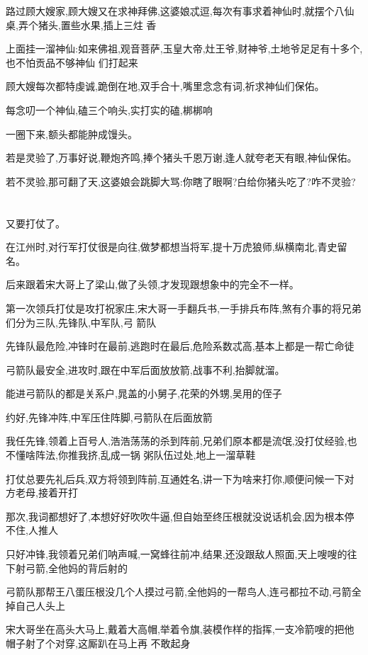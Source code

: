 ﻿\documentclass[12pt]{article}
\begin{document}
路过顾大嫂家,顾大嫂又在求神拜佛,这婆娘忒逗,每次有事求着神仙时,就摆个八仙桌,弄个猪头,置些水果,插上三炷
香

上面挂一溜神仙:如来佛祖,观音菩萨,玉皇大帝,灶王爷,财神爷,土地爷\dldots 足足有十多个,也不怕贡品不够神仙
们打起来

顾大嫂每次都特虔诚,跪倒在地,双手合十,嘴里念念有词,祈求神仙们保佑。

每念叨一个神仙,磕三个响头,实打实的磕,梆梆响\dldots

一圈下来,额头都能肿成馒头。

若是灵验了,万事好说,鞭炮齐鸣,捧个猪头千恩万谢,逢人就夸老天有眼,神仙保佑。

若不灵验,那可翻了天,这婆娘会跳脚大骂:你瞎了眼啊?白给你猪头吃了?咋不灵验?

\section{}

又要打仗了。

在江州时,对行军打仗很是向往,做梦都想当将军,提十万虎狼师,纵横南北,青史留名。

后来跟着宋大哥上了梁山,做了头领,才发现跟想象中的完全不一样。

第一次领兵打仗是攻打祝家庄,宋大哥一手翻兵书,一手排兵布阵,煞有介事的将兄弟们分为三队,先锋队,中军队,弓
箭队

先锋队最危险,冲锋时在最前,逃跑时在最后,危险系数忒高,基本上都是一帮亡命徒

弓箭队最安全,进攻时,跟在中军后面放放箭,战事不利,抬脚就溜。

能进弓箭队的都是关系户,晁盖的小舅子,花荣的外甥,吴用的侄子\dldots

约好,先锋冲阵,中军压住阵脚,弓箭队在后面放箭

我任先锋,领着上百号人,浩浩荡荡的杀到阵前,兄弟们原本都是流氓,没打仗经验,也不懂啥阵法,你推我挤,乱成一锅
粥\dldots 队伍过处,地上一溜草鞋\dldots

打仗总要先礼后兵,双方将领到阵前,互通姓名,讲一下为啥来打你,顺便问候一下对方老母,接着开打\dldots

那次,我词都想好了,本想好好吹吹牛逼,但自始至终压根就没说话机会,因为根本停不住,人推人\dldots

只好冲锋,我领着兄弟们呐声喊,一窝蜂往前冲,结果,还没跟敌人照面,天上嗖嗖的往下射弓箭,全他妈的背后射的

弓箭队那帮王八蛋压根没几个人摸过弓箭,全他妈的一帮鸟人,连弓都拉不动,弓箭全掉自己人头上

宋大哥坐在高头大马上,戴着大高帽,举着令旗,装模作样的指挥,一支冷箭嗖的把他帽子射了个对穿,这厮趴在马上再
不敢起身
\end{document}
